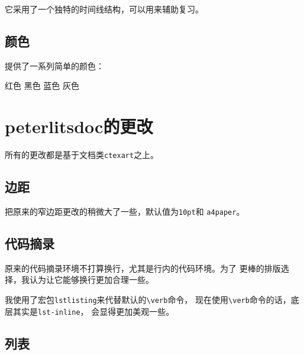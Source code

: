 \documentclass{../src/peterlitsdoc}
\newcommand{\vb}{\verb}
\begin{document}

它采用了一个独特的时间线结构，可以用来辅助复习。


\subsection{颜色}

提供了一系列简单的颜色：

\begin{pltrun}
\pltred   红色\pltrule
\pltblack 黑色\pltrule
\pltblue  蓝色\pltrule
\pltgray  灰色\pltrule
\end{pltrun}


\section{peterlitsdoc的更改}

所有的更改都是基于文档类\vb|ctexart|之上。


\subsection{边距}

把原来的窄边距更改的稍微大了一些，默认值为\vb|10pt|和
\vb|a4paper|。


\subsection{代码摘录}

原来的代码摘录环境不打算换行，尤其是行内的代码环境。为了
更棒的排版选择，我认为让它能够换行更加合理一些。

我使用了宏包\vb|lstlisting|来代替默认的\verb|\verb|命令，
现在使用\verb|\verb|命令的话，底层其实是\vb|lst-inline|，
会显得更加美观一些。


\subsection{列表}
\end{document}
